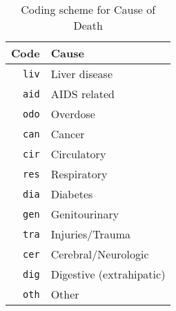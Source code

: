 \begin{table}[h]
  \caption{Coding scheme for Cause of Death}
  \label{tbl:cause-of-death}
  \begin{tabular}{rl}
    Code                & Cause \\ \hline
    \texttt{liv}        & Liver disease \\
    \texttt{aid}        & AIDS related \\
    \texttt{odo}        & Overdose \\
    \texttt{can}        & Cancer \\
    \texttt{cir}        & Circulatory \\
    \texttt{res}        & Respiratory \\
    \texttt{dia}        & Diabetes \\
    \texttt{gen}        & Genitourinary \\
    \texttt{tra}        & Injuries/Trauma \\
    \texttt{cer}        & Cerebral/Neurologic \\
    \texttt{dig}        & Digestive (extrahipatic) \\
    \texttt{oth}        & Other \\
  \end{tabular}
\end{table}

